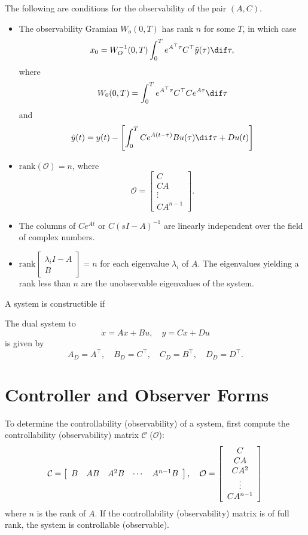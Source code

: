 \documentclass{article}
\begin{document}
The following are conditions for the observability of the pair
$(A,C)$.
\begin{itemize}
  \item{
    The observability Gramian $W_o(0, T)$ has rank $n$ for some $T$,
    in which case
    $$
    x_0 =
    W_O^{-1}(0, T)\int_0^T e^{A^\top \tau} C^\top \tilde{y}(\tau) \dif
    \tau,
    $$
    where
    $$
    W_0(0, T) = \int_0^T e^{A^\top \tau} C^\top C e^{A \tau} \dif \tau
    $$
    and
    $$
    \tilde{y}(t)
    = y(t)
    - \left[
        \int_0^T C e^{A(t - \tau)} B u(\tau) \dif \tau + D u(t)
      \right]
    $$
  }
  \item{
    $\mathrm{rank}(\mathcal{O}) = n$, where
    $$
    \mathcal{O} =
    \left[\begin{array}{c}
      C        \\
      C A      \\
      \vdots   \\
      C A^{n-1}
    \end{array}\right].
    $$
  }
  \item{
    The columns of $C e^{A t}$ or $C (sI - A)^{-1}$ are linearly independent over the field
    of complex numbers.
  }
  \item{
    $\mathrm{rank}
       \left[\begin{array}{c}
         \lambda_i I - A \\
         B
       \end{array}\right] = n$ for each eigenvalue $\lambda_i$
    of $A$. The eigenvalues yielding a rank less than $n$ are the
    unobservable eigenvalues of the system.
  }
\end{itemize}

A system is constructible if

The dual system to
$$
\dot{x} = A x + B u, \quad
y = C x + D u
$$
is given by
$$
A_D = A^\top, \quad
B_D = C^\top, \quad
C_D = B^\top, \quad
D_D = D^\top.
$$

\section{Controller and Observer Forms}

To determine the controllability (observability) of a system, first compute
the controllability (observability) matrix $\mathcal{C}$ ($\mathcal{O}$):
$$
\mathcal{C} =
\left[\begin{array}{c c c c c}
  B & A B & A^2 B & \cdots & A^{n-1} B
\end{array}\right], \quad
\mathcal{O} =
\left[\begin{array}{c}
  C        \\
  C A      \\
  C A^2    \\
  \vdots   \\
  C A^{n-1}
\end{array}\right]
$$
where $n$ is the rank of $A$. If the controllability (observability)
matrix is of full rank, the system is controllable (observable).
\end{document}
